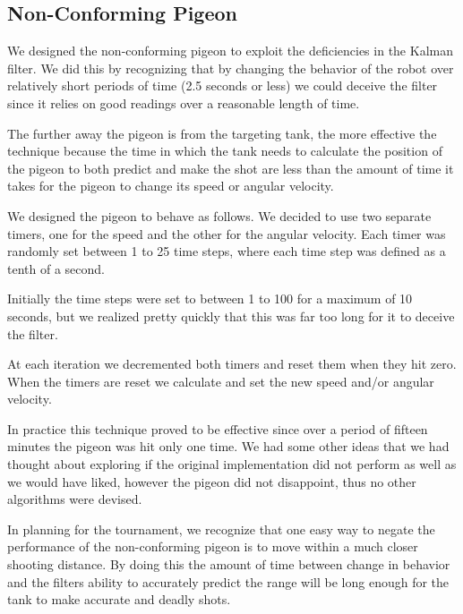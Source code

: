 \subsection{Non-Conforming Pigeon}
We designed the non-conforming pigeon to exploit the deficiencies in the Kalman filter.  We did this by recognizing that by changing the behavior of the robot over relatively short periods of time (2.5 seconds or less) we could deceive the filter since it relies on good readings over a reasonable length of time.
\par
The further away the pigeon is from the targeting tank, the more effective the technique because the time in which the tank needs to calculate the position of the pigeon to both predict and make the shot are less than the amount of time it takes for the pigeon to change its speed or angular velocity.
\par
We designed the pigeon to behave as follows.  We decided to use two separate timers, one for the speed and the other for the angular velocity.  Each timer was randomly set between 1 to 25 time steps, where each time step was defined as a tenth of a second.
\par
Initially the time steps were set to between 1 to 100 for a maximum of 10 seconds, but we realized pretty quickly that this was far too long for it to deceive the filter.
\par
At each iteration we decremented both timers and reset them when they hit zero.  When the timers are reset we calculate and set the new speed and/or angular velocity.
\par
In practice this technique proved to be effective since over a period of fifteen minutes the pigeon was hit only one time.  We had some other ideas that we had thought about exploring if the original implementation did not perform as well as we would have liked, however the pigeon did not disappoint, thus no other algorithms were devised.
\par
In planning for the tournament, we recognize that one easy way to negate the performance of the non-conforming pigeon is to move within a much closer shooting distance.  By doing this the amount of time between change in behavior and the filters ability to accurately predict the range will be long enough for the tank to make accurate and deadly shots.
